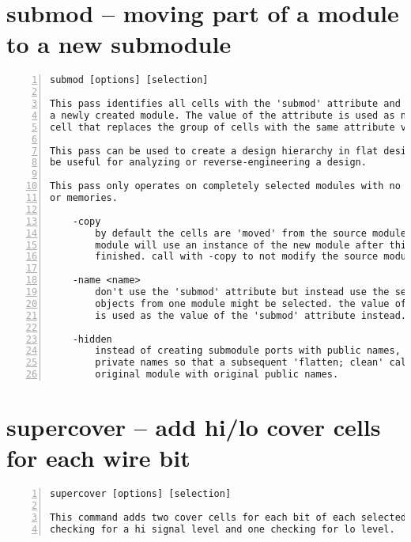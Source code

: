 \section{submod -- moving part of a module to a new submodule}
\label{cmd:submod}
\begin{lstlisting}[numbers=left,frame=single]
    submod [options] [selection]

This pass identifies all cells with the 'submod' attribute and moves them to
a newly created module. The value of the attribute is used as name for the
cell that replaces the group of cells with the same attribute value.

This pass can be used to create a design hierarchy in flat design. This can
be useful for analyzing or reverse-engineering a design.

This pass only operates on completely selected modules with no processes
or memories.

    -copy
        by default the cells are 'moved' from the source module and the source
        module will use an instance of the new module after this command is
        finished. call with -copy to not modify the source module.

    -name <name>
        don't use the 'submod' attribute but instead use the selection. only
        objects from one module might be selected. the value of the -name option
        is used as the value of the 'submod' attribute instead.

    -hidden
        instead of creating submodule ports with public names, create ports with
        private names so that a subsequent 'flatten; clean' call will restore the
        original module with original public names.
\end{lstlisting}

\section{supercover -- add hi/lo cover cells for each wire bit}
\label{cmd:supercover}
\begin{lstlisting}[numbers=left,frame=single]
    supercover [options] [selection]

This command adds two cover cells for each bit of each selected wire, one
checking for a hi signal level and one checking for lo level.
\end{lstlisting}

